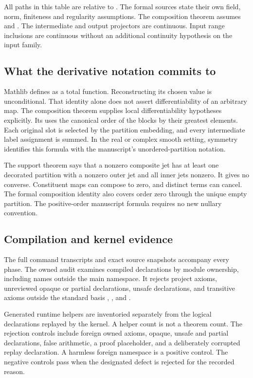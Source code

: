 All paths in this table are relative to . The formal sources state their own field, norm, finiteness and regularity assumptions. The composition theorem assumes  and . The intermediate and output projectors are continuous. Input range inclusions are continuous without an additional continuity hypothesis on the input family.

\subsection*{What the derivative notation commits to}
Mathlib defines  as a total function. Reconstructing its chosen value is unconditional. That identity alone does not assert differentiability of an arbitrary map. The composition theorem supplies local differentiability hypotheses explicitly. Its  uses the canonical order of the blocks by their greatest elements. Each original slot is selected by the partition embedding, and every intermediate label assignment is summed. In the real or complex smooth setting, symmetry identifies this formula with the manuscript's unordered-partition notation.

The support theorem says that a nonzero composite jet has at least one decorated partition with a nonzero outer jet and all inner jets nonzero. It gives no converse. Constituent maps can compose to zero, and distinct terms can cancel. The formal composition identity also covers order zero through the unique empty partition. The positive-order manuscript formula requires no new nullary convention.

\subsection*{Compilation and kernel evidence}

The full command transcripts and exact source snapshots accompany every phase. The owned audit examines compiled declarations by module ownership, including names outside the main namespace. It rejects project axioms, unreviewed opaque or partial declarations, unsafe declarations, and transitive axioms outside the standard basis , , and .

Generated runtime helpers are inventoried separately from the logical declarations replayed by the kernel. A helper count is not a theorem count. The rejection controls include foreign owned axioms, opaque, unsafe and partial declarations, false arithmetic, a proof placeholder, and a deliberately corrupted replay declaration. A harmless foreign namespace is a positive control. The negative controls pass when the designated defect is rejected for the recorded reason.

